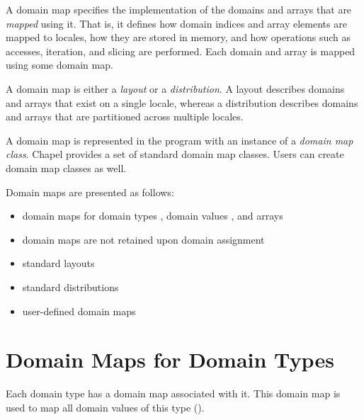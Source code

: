 \label{Domain_Maps}

A domain map specifies the implementation of the domains and arrays
that are \emph{mapped} using it. That is, it defines how domain indices
and array elements are mapped to locales, how they are stored in
memory, and how operations such as accesses, iteration, and slicing
are performed.  Each domain and array is mapped using some domain map.

A domain map is either a \emph{layout} or a \emph{distribution}.
A layout describes domains and arrays that exist on a single locale,
whereas a distribution describes domains and arrays that are
partitioned across multiple locales.

A domain map is represented in the program with an instance of
a \emph{domain map class}.
Chapel provides a set of standard domain map classes.
Users can create domain map classes as well.

Domain maps are presented as follows:
\begin{itemize}
\item domain maps for domain types ,
      domain values , and
      arrays 
\item domain maps are not retained upon domain assignment
\item standard layouts 
\item standard distributions 
\item user-defined domain maps 
\end{itemize}


\section{Domain Maps for Domain Types}
\label{Domain_Maps_For_Types}

Each domain type has a domain map associated with it.
This domain map is used to map all domain values of this type
().

